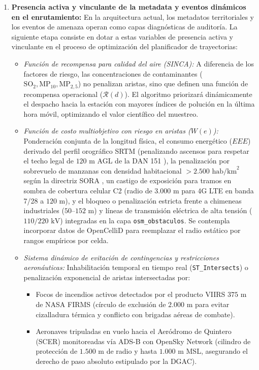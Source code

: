 \documentclass[letterpaper,12pt]{article}
\begin{document}
\begin{enumerate}
    \item \textbf{Presencia activa y vinculante de la metadata y eventos dinámicos en el enrutamiento:}
    En la arquitectura actual, los metadatos territoriales y los eventos de amenaza operan como capas diagnósticas de auditoría. La siguiente etapa consiste en dotar a estas variables de presencia activa y vinculante en el proceso de optimización del planificador de trayectorias:
    \begin{itemize}
        \item \textit{Función de recompensa para calidad del aire (SINCA):} A diferencia de los factores de riesgo, las concentraciones de contaminantes ($\text{SO}_2, \text{MP}_{10}, \text{MP}_{2{,}5}$) no penalizan aristas, sino que definen una función de recompensa operacional ($\mathcal{R}(d)$). El algoritmo priorizará dinámicamente el despacho hacia la estación con mayores índices de polución en la última hora móvil, optimizando el valor científico del muestreo.
        \item \textit{Función de costo multiobjetivo con riesgo en aristas ($W(e)$):} Ponderación conjunta de la longitud física, el consumo energético ($EEE$) derivado del perfil orográfico SRTM (penalizando ascensos para respetar el techo legal de $120\text{ m}$ AGL de la DAN 151 \cite{dan151}), la penalización por sobrevuelo de manzanas con densidad habitacional $>2.500\text{ hab/km}^2$ según la directriz SORA \cite{sora}, un castigo de exposición para tramos en sombra de cobertura celular C2 (radio de $3.000\text{ m}$ para 4G LTE en banda 7/28 a $120\text{ m}$), y el bloqueo o penalización estricta frente a chimeneas industriales ($50\text{--}152\text{ m}$) y líneas de transmisión eléctrica de alta tensión ($110/220\text{ kV}$) integradas en la capa \texttt{osm\_obstaculos}. Se contempla incorporar datos de OpenCelliD \cite{opencellid} para reemplazar el radio estático por rangos empíricos por celda.
        \item \textit{Sistema dinámico de evitación de contingencias y restricciones aeronáuticas:} Inhabilitación temporal en tiempo real (\texttt{ST\_Intersects}) o penalización exponencial de aristas intersectadas por:
        \begin{itemize}
            \item Focos de incendios activos detectados por el producto VIIRS $375\text{ m}$ de NASA FIRMS \cite{schroeder} (círculo de exclusión de $2.000\text{ m}$ para evitar cizalladura térmica y conflicto con brigadas aéreas de combate).
            \item Aeronaves tripuladas en vuelo hacia el Aeródromo de Quintero (SCER) monitoreadas vía ADS-B con OpenSky Network \cite{opensky} (cilindro de protección de $1.500\text{ m}$ de radio y hasta $1.000\text{ m}$ MSL, asegurando el derecho de paso absoluto estipulado por la DGAC).

\end{itemize}
\end{itemize}
\end{enumerate}
\end{document}
